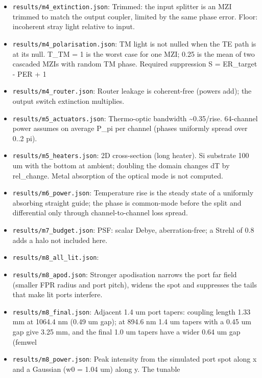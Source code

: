 \begin{itemize}
  \texttt{results/m4\_dynamics.json}: Vpi at 894.6 nm is bracketed, not
  known: lambda scaling of the 795 nm device and linear interpolation to
  the 1013 nm device (a different design) differ.
\item
  \texttt{results/m4\_extinction.json}: Trimmed: the input splitter is
  an MZI trimmed to match the output coupler, limited by the same phase
  error. Floor: incoherent stray light relative to input.
\item
  \texttt{results/m4\_polarisation.json}: TM light is not nulled when
  the TE path is at its null. T\_TM = 1 is the worst case for one MZI;
  0.25 is the mean of two cascaded MZIs with random TM phase. Required
  suppression S = ER\_target - PER + 1
\item
  \texttt{results/m4\_router.json}: Router leakage is coherent-free
  (powers add); the output switch extinction multiplies.
\item
  \texttt{results/m5\_actuators.json}: Thermo-optic bandwidth
  \textasciitilde0.35/rise. 64-channel power assumes on average P\_pi
  per channel (phases uniformly spread over 0..2 pi).
\item
  \texttt{results/m5\_heaters.json}: 2D cross-section (long heater). Si
  substrate 100 um with the bottom at ambient; doubling the domain
  changes dT by rel\_change. Metal absorption of the optical mode is not
  computed.
\item
  \texttt{results/m6\_power.json}: Temperature rise is the steady state
  of a uniformly absorbing straight guide; the phase is common-mode
  before the split and differential only through channel-to-channel loss
  spread.
\item
  \texttt{results/m7\_budget.json}: PSF: scalar Debye, aberration-free;
  a Strehl of 0.8 adds a halo not included here.
\item
  \texttt{results/m8\_all\_lit.json}:
\item
  \texttt{results/m8\_apod.json}: Stronger apodisation narrows the port
  far field (smaller FPR radius and port pitch), widens the spot and
  suppresses the tails that make lit ports interfere.
\item
  \texttt{results/m8\_final.json}: Adjacent 1.4 um port tapers: coupling
  length 1.33 mm at 1064.4 nm (0.49 um gap); at 894.6 nm 1.4 um tapers
  with a 0.45 um gap give 3.25 mm, and the final 1.0 um tapers have a
  wider 0.64 um gap (femwel
\item
  \texttt{results/m8\_power.json}: Peak intensity from the simulated
  port spot along x and a Gaussian (w0 = 1.04 um) along y. The tunable

\end{itemize}

